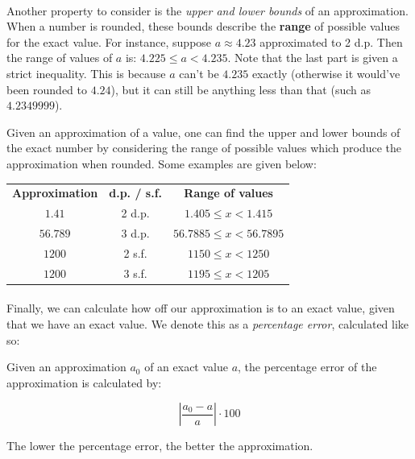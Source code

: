 \documentclass[12pt, a4paper, titlepage, twoside]{article}
\begin{document}
	\paragraph{}
	Another property to consider is the \textit{upper and lower bounds} of an approximation. When a number is rounded,
	these bounds describe the \textbf{range} of possible values for the exact value. For instance, suppose $a \approx 4.23$ approximated
	to 2 d.p. Then the range of values of $a$ is: $4.225 \leq a < 4.235$. Note that the last part is given a strict inequality.
	This is because $a$ can't be $4.235$ exactly (otherwise it would've been rounded to $4.24$), but it can still be anything less
	than that (such as $4.2349999$). \\
	
	\begin{kp}
		Given an approximation of a value, one can find the upper and lower bounds of the exact number by considering the range of possible
		values which produce the approximation when rounded. Some examples are given below:\\
		
		\begin{longtable}{|c|c|c|}
			\hline
			\textbf{Approximation} & \textbf{d.p. / s.f.} & \textbf{Range of values}\\
			\hhline{|=|=|=|}
			$1.41$ & 2 d.p. & $1.405 \leq x < 1.415$\\
			\hline
			$56.789$ & 3 d.p. & $56.7885 \leq x < 56.7895$\\
			\hline
			$1200$ & 2 s.f. & $1150 \leq x < 1250$\\
			\hline
			$1200$ & 3 s.f. & $1195 \leq x < 1205$\\
			\hline
		\end{longtable}
	\end{kp}
	
	\paragraph{}
	Finally, we can calculate how off our approximation is to an exact value, given that we have an exact value.
	We denote this as a \textit{percentage error}, calculated like so:\\
	
	\begin{kp}
		Given an approximation $a_0$ of an exact value $a$, the percentage error of the approximation is calculated by:
		
		$$\left\lvert \dfrac{a_0 - a}{a} \right\rvert \cdot 100$$
		
		The lower the percentage error, the better the approximation.
	\end{kp}
	
\end{document}
